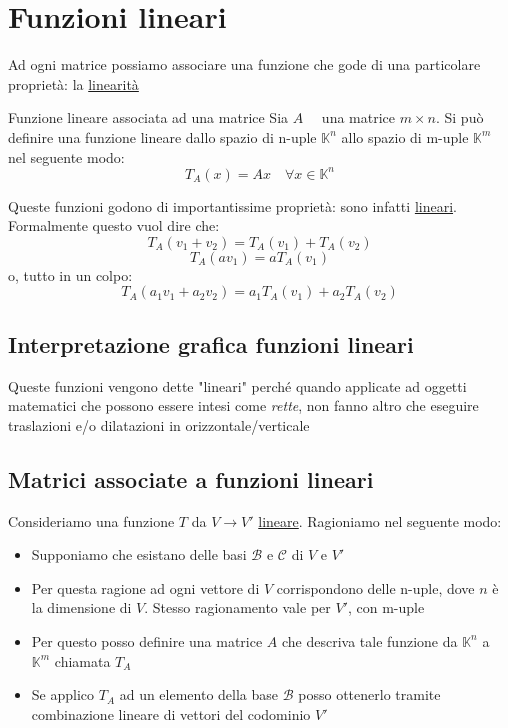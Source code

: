 \section{Funzioni lineari}
Ad ogni matrice possiamo associare una funzione che gode di una particolare proprietà: la \underline{linearità}
\begin{definizione}{Funzione lineare associata ad una matrice}
	Sia $ A \quad $ una matrice $ m \times n  $. Si può definire una funzione lineare dallo spazio di n-uple $ \mathbb{K}^{n} $ allo spazio di m-uple $ \mathbb{K}^{m} $ nel seguente modo:
	\[
		T_A \left( x \right) = Ax \quad \forall x \in  \mathbb{K} ^{n}
	\]
\end{definizione}
Queste funzioni godono di importantissime proprietà: sono infatti \underline{lineari}. Formalmente questo vuol dire che:
\[
	T_A \left( v_1 + v_2 \right) = T_A \left( v_1 \right) + T_A \left( v_2 \right)
\]
\[
	T_A\left( av_1 \right) =a T_A\left( v_1 \right)
\]
o, tutto in un colpo:
\[
	T_A \left( a_1v_1 + a_2v_2 \right) =a_1 T_A \left( v_1 \right) +a_2 T_A \left( v_2 \right)
\]
\subsection{Interpretazione grafica funzioni lineari}
Queste funzioni vengono dette "lineari" perché quando applicate ad oggetti matematici che possono essere intesi come \textit{rette}, non fanno altro che eseguire traslazioni e/o dilatazioni in orizzontale/verticale
\subsection{Matrici associate a funzioni lineari}
Consideriamo una funzione $ T $ da $ V \to V' $ \underline{lineare}. Ragioniamo nel seguente modo:
\begin{itemize}
	\item Supponiamo che esistano delle basi $ \mathcal{B} $ e $ \mathcal{C} $ di $ V $ e $ V' $
	\item Per questa ragione ad ogni vettore di $ V $ corrispondono delle n-uple, dove $ n $ è la dimensione di $ V $. Stesso ragionamento vale per $ V' $, con m-uple
	\item Per questo posso definire una matrice $ A $ che descriva tale funzione da $ \mathbb{K}^{n} $  a $ \mathbb{K}^{m} $ chiamata $ T_A $
	\item Se applico $ T_A $ ad un elemento della base $ \mathcal{B} $ posso ottenerlo tramite combinazione lineare di vettori del codominio $ V' $
\end{itemize}
